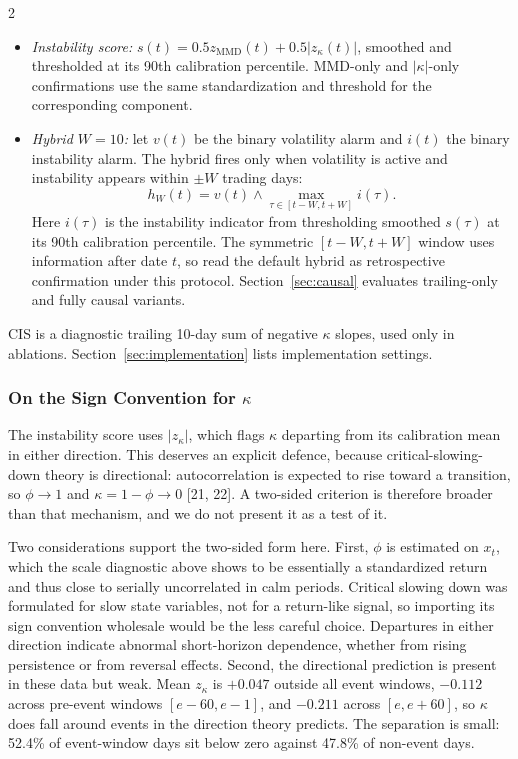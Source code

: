 \documentclass{book}
\begin{document}
\begin{multicols}{2}
\begin{itemize}
\item \textit{Instability score:} $s(t)=0.5z_{\mathrm{MMD}}(t)+0.5|z_\kappa(t)|$, smoothed and thresholded at its 90th calibration percentile. MMD-only and $|\kappa|$-only confirmations use the same standardization and threshold for the corresponding component.
\item \textit{Hybrid $W=10$:} let $v(t)$ be the binary volatility alarm and $i(t)$ the binary instability alarm. The hybrid fires only when volatility is active and instability appears within $\pm W$ trading days:
\begin{equation}
h_W(t)=v(t)\wedge \max_{\tau\in[t-W,t+W]}i(\tau).
\end{equation}
Here $i(\tau)$ is the instability indicator from thresholding smoothed $s(\tau)$ at its 90th calibration percentile. The symmetric $[t-W,t+W]$ window uses information after date $t$, so read the default hybrid as retrospective confirmation under this protocol. Section~\ref{sec:causal} evaluates trailing-only and fully causal variants.
\end{itemize}
CIS is a diagnostic trailing 10-day sum of negative $\kappa$ slopes, used only in ablations. Section~\ref{sec:implementation} lists implementation settings.

\subsubsection{On the Sign Convention for $\kappa$}
The instability score uses $|z_\kappa|$, which flags $\kappa$ departing from its calibration mean in either direction. This deserves an explicit defence, because critical-slowing-down theory is directional: autocorrelation is expected to rise toward a transition, so $\phi\to1$ and $\kappa=1-\phi\to0$ [21, 22]. A two-sided criterion is therefore broader than that mechanism, and we do not present it as a test of it.

Two considerations support the two-sided form here. First, $\phi$ is estimated on $x_t$, which the scale diagnostic above shows to be essentially a standardized return and thus close to serially uncorrelated in calm periods. Critical slowing down was formulated for slow state variables, not for a return-like signal, so importing its sign convention wholesale would be the less careful choice. Departures in either direction indicate abnormal short-horizon dependence, whether from rising persistence or from reversal effects. Second, the directional prediction is present in these data but weak. Mean $z_\kappa$ is $+0.047$ outside all event windows, $-0.112$ across pre-event windows $[e-60,e-1]$, and $-0.211$ across $[e,e+60]$, so $\kappa$ does fall around events in the direction theory predicts. The separation is small: 52.4\% of event-window days sit below zero against 47.8\% of non-event days.


\end{multicols}
\end{document}
